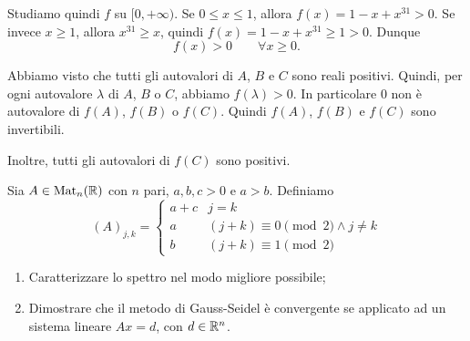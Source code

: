 \documentclass[a4paper]{article}
\begin{document}
\begin{snippetsolution}{}
\begin{enumerate}
            Studiamo quindi \(f\) su \([0,+\infty)\). Se \(0 \leq x \leq 1\), allora
            \(f(x)=1-x+x^{31} > 0\). Se invece \(x \geq 1\), allora \(x^{31} \geq x\),
            quindi \(f(x)=1-x+x^{31} \geq 1 >0\). Dunque
            \[
                f(x)>0
                \qquad
                \forall x \geq 0.
            \]

            Abbiamo visto che tutti gli autovalori di \(A\), \(B\) e \(C\)
            sono reali positivi. Quindi, per ogni autovalore \(\lambda\) di
            \(A\), \(B\) o \(C\), abbiamo \(f(\lambda)>0\).
            In particolare \(0\) non è autovalore di \(f(A)\), \(f(B)\) o \(f(C)\).
            Quindi \(f(A)\), \(f(B)\) e \(f(C)\) sono invertibili.

            Inoltre, tutti gli autovalori di \(f(C)\) sono positivi.
    \end{enumerate}
\end{snippetsolution}

\begin{snippetexercise}{}
    Sia \(A \in \operatorname{Mat}_n(\mathbb{R})\)
    con \(n\) pari, \(a,b,c>0\) e \(a>b\). Definiamo
    \[
        \left(A\right)_{j,k} =
        \begin{cases}
            a + c & j=k \\
            a & (j+k) \equiv 0 \pmod{2} \land j \neq k \\
            b & (j+k) \equiv 1 \pmod{2}
        \end{cases}
    \]
    \begin{enumerate}
        \item Caratterizzare lo spettro nel modo migliore possibile;
        \item Dimostrare che il metodo di Gauss-Seidel è convergente
            se applicato ad un sistema lineare \(Ax = d\), con \(d \in \mathbb{R}^n\).
    \end{enumerate}
\end{snippetexercise}
\end{document}
